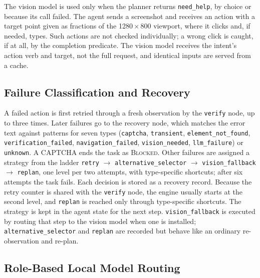The vision model is used only when the planner returns \texttt{need\_help}, by choice or because its call failed. The agent sends a screenshot and receives an action with a target point given as fractions of the 1280\,$\times$\,800 viewport, where it clicks and, if needed, types. Such actions are not checked individually; a wrong click is caught, if at all, by the completion predicate. The vision model receives the intent's action verb and target, not the full request, and identical inputs are served from a cache.



\subsection{Failure Classification and Recovery}
\label{sec:recovery}

A failed action is first retried through a fresh observation by the \texttt{verify} node, up to three times. Later failures go to the recovery node, which matches the error text against patterns for seven types (\texttt{captcha}, \texttt{transient}, \texttt{element\_not\_found}, \texttt{verification\_failed}, \texttt{navigation\_failed}, \texttt{vision\_needed}, \texttt{llm\_failure}) or \texttt{unknown}. A CAPTCHA ends the task as \textsc{Blocked}. Other failures are assigned a strategy from the ladder \texttt{retry} $\rightarrow$ \texttt{alternative\_selector} $\rightarrow$ \texttt{vision\_fallback} $\rightarrow$ \texttt{replan}, one level per two attempts, with type-specific shortcuts; after six attempts the task fails. Each decision is stored as a recovery record. Because the retry counter is shared with the \texttt{verify} node, the engine usually starts at the second level, and \texttt{replan} is reached only through type-specific shortcuts. The strategy is kept in the agent state for the next step. \texttt{vision\_fallback} is executed by routing that step to the vision model when one is installed; \texttt{alternative\_selector} and \texttt{replan} are recorded but behave like an ordinary re-observation and re-plan.

\subsection{Role-Based Local Model Routing}
\label{sec:routing}

